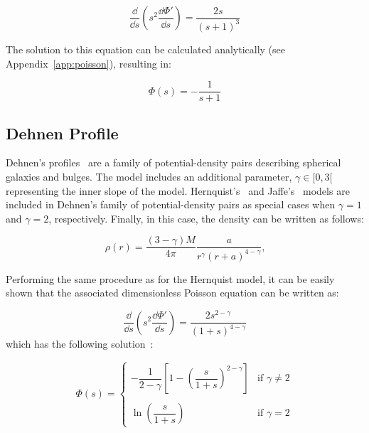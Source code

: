 \begin{equation}
\label{eq:residual_poisson_hernquist1}
\boxed{\dfrac{\dd}{\dd s}\left(s^2 \dfrac{\dd \Phi'}{\dd s}\right) = \dfrac{2s}{(s+1)^3}}
\end{equation}

The solution to this equation can be calculated analytically (see Appendix~\ref{app:poisson}), resulting in:

\begin{equation}
\label{eq:hernquist_pot}
\Phi(s) = - \frac{1}{s + 1}
\end{equation}

\subsection{Dehnen Profile}
Dehnen's profiles~\cite{dehnen_family_1993} are a family of potential-density pairs describing spherical galaxies and bulges. The model includes an additional parameter, $\gamma \in [0, 3[$ representing the inner slope of the model. Hernquist's~\cite{hernquist_analytical_1990} and Jaffe's~\cite{jaffe1983simple} models are included in Dehnen's family of potential-density pairs as special cases when $\gamma=1$ and $\gamma=2$, respectively. Finally, in this case, the density can be written as follows:

\begin{equation}
    \label{eq:density-dehnen}
    \rho(r) = \dfrac{(3-\gamma)M}{4\pi}\dfrac{a}{r^{\gamma}(r+a)^{4-\gamma}}\text{,}
\end{equation}

Performing the same procedure as for the Hernquist model, it can be easily shown that the associated dimensionless Poisson equation can be written as:

\begin{equation}
\label{eq:poisson-dehnen}
\dfrac{\dd}{\dd s}\left(s^2 \dfrac{\dd \Phi'}{\dd s}\right) = \dfrac{2s^{2-\gamma}}{(1+s)^{4-\gamma}}
\end{equation}
which has the following solution~\cite{dehnen_family_1993}:

\begin{equation}
    \label{eq:pot-dehnen}
    \Phi(s) = 
    \begin{cases} 
    -\dfrac{1}{2 - \gamma} \left[1 - \left( \dfrac{s}{1 + s} \right )^{2-\gamma}\right] & \text{if } \gamma \neq 2 \\
    \\
    \ln \left(\dfrac{s}{1 + s}\right) & \text{if } \gamma = 2
    \end{cases}
\end{equation}

